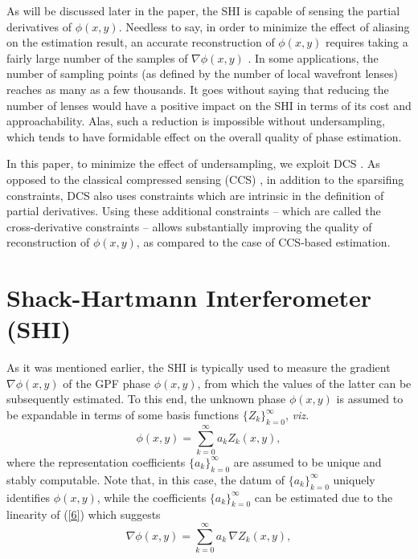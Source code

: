 \pdfoutput=1 \documentclass[journal]{IEEEtran}
\begin{document}
As will be discussed later in the paper, the SHI is capable of sensing the partial derivatives of $\phi(x,y)$. Needless to say, in order to minimize the effect of aliasing on the estimation result, an accurate reconstruction of $\phi(x,y)$ requires taking a fairly large number of the samples of $\nabla \phi (x,y)$ \cite{Oleg2008}. In some applications, the number of sampling points (as defined by the number of local wavefront lenses) reaches as many as a few thousands. It goes without saying that reducing the number of lenses would have a positive impact on the SHI in terms of its cost and approachability. Alas, such a reduction is impossible without undersampling, which tends to have formidable effect on the overall quality of phase estimation.

In this paper, to minimize the effect of undersampling, we exploit DCS \cite{14}. As opposed to the classical compressed sensing (CCS) \cite{13}, in addition to the sparsifing constraints, DCS also uses constraints which are intrinsic in the definition of partial derivatives. Using these additional constraints -- which are called the cross-derivative constraints -- allows substantially improving the quality of reconstruction of $\phi(x,y)$, as compared to the case of CCS-based estimation.

\section{Shack-Hartmann Interferometer (SHI)}
As it was mentioned earlier, the SHI is typically used to measure the gradient $\nabla \phi(x,y)$ of the GPF phase $\phi(x,y)$, from which the values of the latter can be subsequently estimated. To this end, the unknown phase $\phi(x,y)$ is assumed to be expandable in terms of some basis functions $\{Z_k\}_{k=0}^\infty$, {\it viz.} \cite{18}
\begin{equation} \label{6}
\phi(x,y)=\sum_{k=0}^{\infty} a_k Z_k(x,y),
\end{equation}
where the representation coefficients $\{a_k\}_{k=0}^\infty$ are assumed to be unique and stably computable. Note that, in this case, the datum of $\{a_k\}_{k=0}^\infty$ uniquely identifies $\phi(x,y)$, while the coefficients $\{a_k\}_{k=0}^\infty$ can be estimated due to the linearity of (\ref{6}) which suggests
\begin{equation} \label{6.1}
\nabla \phi(x,y)=\sum_{k=0}^{\infty} a_k \, \nabla Z_k(x,y),
\end{equation}
\end{document}
